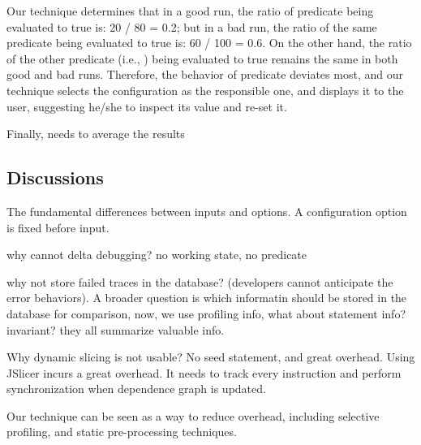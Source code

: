 Our technique determines that in a good run, the ratio of predicate 
 being evaluated to true is: 20 / 80 = 0.2;
but in a bad run, the ratio of the same predicate being evaluated to true is: 60 / 100 = 0.6.
On the other hand, the ratio of the other predicate (i.e., ) being evaluated to true
remains the same in both good and bad runs. Therefore, the behavior
of predicate  deviates most, and our technique
selects the  configuration as the responsible one, and displays it to the user, suggesting he/she
to inspect its value and re-set it.


Finally, needs to average the results

\subsection{Discussions}

The fundamental differences between inputs and options. A configuration
option is fixed before input.

why cannot delta debugging? no working state, no predicate

why not store failed traces in the database? (developers
cannot anticipate the error behaviors). A broader question is which
informatin should be stored in the database for comparison, now, we use
profiling info, what about statement info? invariant? they all
summarize valuable info.

Why dynamic slicing is not usable? No seed statement, and great overhead. Using JSlicer incurs
a great overhead. It needs to track every instruction and
perform synchronization when dependence graph is updated.

Our technique can be seen as a way to reduce overhead,
including selective profiling, and static pre-processing
techniques.

